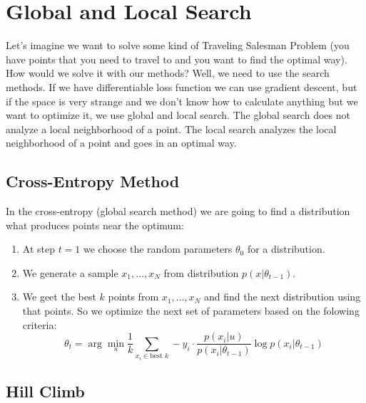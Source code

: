 \chapter{Global and Local Search}

{\sf Let's imagine we want to solve some kind of Traveling Salesman Problem (you have points that you need to travel to and you want to find the optimal way). How would we solve it with our methods? Well, we need to use the search methods. If we have differentiable loss function we can use gradient descent, but if the space is very strange and we don't know how to calculate anything but we want to optimize it, we use global and local search. The global search does not analyze a local neighborhood of a point. The local search analyzes the local neighborhood of a point and goes in an optimal way.}

\section{Cross-Entropy Method}

In the cross-entropy (global search method) we are going to find a distribution what produces points near the optimum:
\begin{enumerate}
	\item At step $t=1$ we choose the random parameters $\theta_0$ for a distribution.
	\item We generate a sample $x_1,\ldots,x_N$ from distribution $p(x|\theta_{t-1})$.
	\item We geet the best $k$ points from $x_1,\ldots,x_N$ and find the next distribution using that points. So we optimize the next set of parameters based on the folowing criteria:
	$$\theta_t=\arg\min\limits_{u}\frac{1}{k}\sum\limits_{x_i\in \text{best }k}-y_i\cdot\frac{p(x_i|u)}{p(x_i|\theta_{t-1})}\log p(x_i| \theta_{t-1})$$
\end{enumerate}

\section{Hill Climb}

